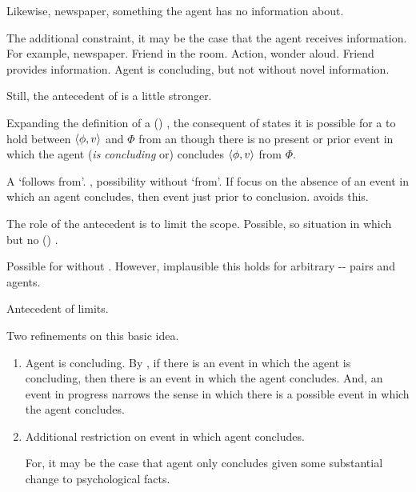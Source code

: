\begin{note}
  Likewise, newspaper, something the agent has no information about.

  The additional constraint, it may be the case that the agent receives information.
  For example, newspaper.
  Friend in the room.
  Action, wonder aloud.
  Friend provides information.
  Agent is concluding, but not without novel information.


  Still, the antecedent of \supportII{} is a little stronger.








  Expanding the definition of a (\pwP{}) \wit{}, the consequent of \supportII{} states it is possible for a \ros{} to hold between \(\langle \phi, v \rangle\) and \(\Phi\) from an  though there is no present or prior event in which the agent (\emph{is concluding} or) concludes \(\langle \phi, v \rangle\) from \(\Phi\).

  A \ros{} `follows from'.
  \supportII{}, possibility without `from'.
  If focus on the absence of an event in which an agent concludes, then event just prior to conclusion.
  \pwit{} avoids this.

  The role of the antecedent is to limit the scope.
  Possible, so situation in which \ros{} but no (\pwP{}) \wit{}.
\end{note}

\begin{note}
  Possible for \ros{} without \wit{}.
  However, implausible this holds for arbitrary -- pairs and agents.

  Antecedent of \supportII{} limits.
\end{note}

\begin{note}
  Two refinements on this basic idea.

  \begin{enumerate}
  \item
    Agent is concluding.
    By \assuPP{}, if there is an event in which the agent is concluding, then there is an event in which the agent concludes.
    And, an event in progress narrows the sense in which there is a possible event in which the agent concludes.
  \item
    Additional restriction on event in which agent concludes.

    For, it may be the case that agent only concludes given some substantial change to psychological facts.
  \end{enumerate}
\end{note}


